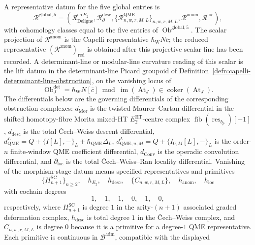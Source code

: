 \begin{defn}
	  A representative datum for the five global entries is
	  \[
	    \mathcal R^{\mathrm{global},5}
	    =
	    \left(
	    \mathcal R^{\mathrm{ch}\,E_2}_{\mathrm{Deligne}},
	    \mathcal R^{\mathrm{desc}}_{\partial},
	    \{\mathcal R^{\mathrm{QME}}_{n,w,r,M,L}\}_{n,w,r,M,L},
	    \mathcal R^{\mathrm{anom}},
	    \mathcal R^{\mathrm{loc}}
	    \right),
	  \]
	  with cohomology classes equal to the five entries of
		  \(\operatorname{Ob}^{\mathrm{global},5}\).  The scalar projection of
		  \(\mathcal R^{\mathrm{anom}}\) is the Capelli representative
		  \(\hbar_{\mathrm{W}}N\bar c\); the reduced representative
		  \((\mathcal R^{\mathrm{anom}})_{\mathrm{red}}\) is obtained after this
		  projective scalar line has been recorded.  A determinant-line or
		  modular-line curvature reading of this scalar is the lift datum in
		  the determinant-line Picard groupoid of
		  Definition~\ref{defn:capelli-determinant-line-obstruction}, on the
		  vanishing locus of
		  \[
		    \operatorname{Ob}^{\det}_J
		    =
		    \hbar_{\mathrm{W}}N[\bar c]
		    \bmod\operatorname{im}(\operatorname{At}_J)
		    \in\operatorname{coker}(\operatorname{At}_J).
		  \]
		  The differentials below are
		  the governing differentials of the corresponding obstruction
	  complexes: \(d_{\mathrm{Mor}}\) is the twisted Maurer--Cartan
	  differential in the shifted homotopy-fibre Morita mixed-HT
	  \(E_2^{\mathrm{HT}}\)-centre complex
	  \(\operatorname{fib}(\operatorname{res}_{b_p})[-1]\),
	  \(d_{\mathrm{desc}}\) is the total Čech--Weiss descent differential,
	  \(d_{\mathrm{QME}}^L=Q+\{I[L],-\}_L+\hbar_{\mathrm{QME}}\Delta_L\),
	  \(d^{L}_{\mathrm{QME},n,M}=Q+\{I_{0,M}[L],-\}_L\) is the
	  order-\(n\) finite-window QME coefficient differential,
	  \(d_{\mathrm{Conv}}\) is the operadic convolution differential, and
	  \(\partial_{\mathrm{loc}}\) is the total Čech--Weiss--Ran locality
	  differential.  Vanishing of the morphism-stage datum means specified
	  representatives and primitives
  \[
    \{H^{\mathrm{SC}}_{n+1}\}_{n\ge2},\quad
    h_{E_2},\quad h_{\mathrm{desc}},\quad \{C_{n,w,r,M,L}\},\quad
    h_{\mathrm{anom}},\quad h_{\mathrm{loc}}
  \]
  with cochain degrees
  \[
    1,\quad 1,\quad 1,\quad 0,\quad 1,\quad 0,
  \]
	  respectively, where \(H^{\mathrm{SC}}_{n+1}\) is degree \(1\) in the
	  arity-\((n+1)\) associated graded deformation complex,
	  \(h_{\mathrm{desc}}\) is total degree \(1\) in the Čech--Weiss
		  complex, and \(C_{n,w,r,M,L}\) is degree \(0\) because it is a primitive for
	  a degree-\(1\) QME representative.  Each primitive is continuous in
  \(\mathcal B^{\mathrm{adm}}\), compatible with the displayed

\end{defn}
